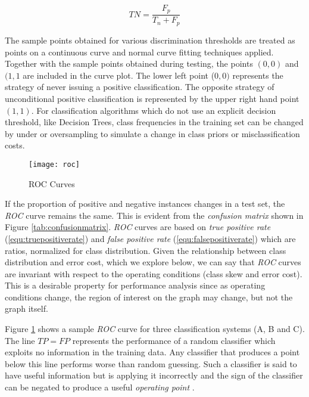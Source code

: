 \documentclass[10pt]{unbthesis}
\begin{document}
\begin{equation}
\label{equ:falsepositiverate}
TN = \frac{F_p}{T_n + F_p}
\end{equation}

The sample points obtained for various
discrimination thresholds are treated as points on a continuous curve
and normal curve fitting techniques applied. Together with the sample
points obtained during testing, the points \((0,0)\) and \((1,1\) are
included in the curve plot. The lower left point (\(0,0)\) represents
the strategy of never issuing a positive classification. The opposite
strategy of unconditional positive classification is represented by the
upper right hand point \((1,1)\). For classification algorithms which
do not use an explicit decision threshold, like Decision Trees, class
frequencies in the training set can be changed by under or
oversampling to simulate a change in class priors or misclassification
costs. 

\begin{figure}
  \begin{center}
    \texttt{[image: roc]}
  \end{center}
  \caption{ROC Curves}
  \label{fig:roc}
\end{figure} 

If the proportion of positive and negative instances changes in a test
set, the \textit{ROC} curve remains the same. This is evident from the
\textit{confusion matrix} shown in Figure
\ref{tab:confusionmatrix}. \textit{ROC} curves are based on
\textit{true positive rate} (\ref{equ:truepositiverate}) and
\textit{false positive rate} (\ref{equ:falsepositiverate}) which are
ratios, normalized for class distribution. Given the relationship
between class distribution and error cost, which we explore below, we
can say that \textit{ROC} curves are invariant with respect to the
operating conditions (class skew and error cost). This is a desirable
property for performance analysis since as operating conditions
change, the region of interest on the graph may change, but not the
graph itself.

Figure \ref{fig:roc} shows a sample
\textit{ROC} curve for three classification systems (A, B and C). The
line \(TP=FP\) represents the performance of a random
classifier which exploits no information in the training data. Any
classifier that produces a point below this line performs worse than
random guessing. Such a classifier is said to have useful information
but is applying it incorrectly and the sign of the classifier can be
negated to produce a useful \textit{operating point} \cite{RefWorks:60}.
\end{document}
